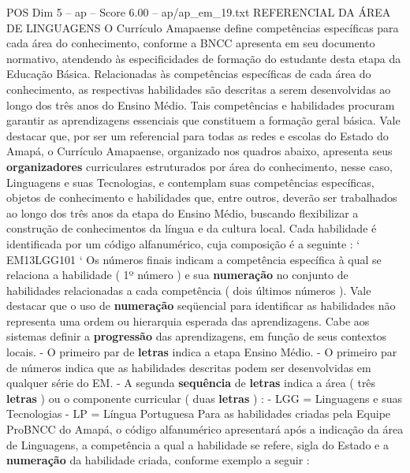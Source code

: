 \begin{textsample}{POS Dim 5 – ap – Score 6.00 – ap/ap\_em\_19.txt}  \label{ex:f5_pos_166}
REFERENCIAL DA ÁREA DE LINGUAGENS O Currículo Amapaense define competências específicas para cada área do conhecimento, conforme a BNCC apresenta em seu documento normativo, atendendo às especificidades de formação do estudante desta etapa da Educação Básica.
Relacionadas às competências específicas de cada área do conhecimento, as respectivas habilidades são descritas a serem desenvolvidas ao longo dos três anos do Ensino Médio.
Tais competências e habilidades procuram garantir as aprendizagens essenciais que constituem a formação geral básica.
Vale destacar que, por ser um referencial para todas as redes e escolas do Estado do Amapá, o Currículo Amapaense, organizado nos quadros abaixo, apresenta seus \textbf{organizadores} curriculares estruturados por área do conhecimento, nesse caso, Linguagens e suas Tecnologias, e contemplam suas competências específicas, objetos de conhecimento e habilidades que, entre outros, deverão ser trabalhados ao longo dos três anos da etapa do Ensino Médio, buscando flexibilizar a construção de conhecimentos da língua e da cultura local.
Cada habilidade é identificada por um código alfanumérico, cuja composição é a seguinte : ` EM13LGG101 ` Os números finais indicam a competência específica à qual se relaciona a habilidade ( 1º número ) e sua \textbf{numeração} no conjunto de habilidades relacionadas a cada competência ( dois últimos números ).
Vale destacar que o uso de \textbf{numeração} seqüencial para identificar as habilidades não representa uma ordem ou hierarquia esperada das aprendizagens.
Cabe aos sistemas definir a \textbf{progressão} das aprendizagens, em função de seus contextos locais. - O primeiro par de \textbf{letras} indica a etapa Ensino Médio. - O primeiro par de números indica que as habilidades descritas podem ser desenvolvidas em qualquer série do EM. - A segunda \textbf{sequência} de \textbf{letras} indica a área ( três \textbf{letras} ) ou o componente curricular ( duas \textbf{letras} ) : - LGG = Linguagens e suas Tecnologias - LP = Língua Portuguesa Para as habilidades criadas pela Equipe ProBNCC do Amapá, o código alfanumérico apresentará após a indicação da área de Linguagens, a competência a qual a habilidade se refere, sigla do Estado e a \textbf{numeração} da habilidade criada, conforme exemplo a seguir :

\end{textsample}
